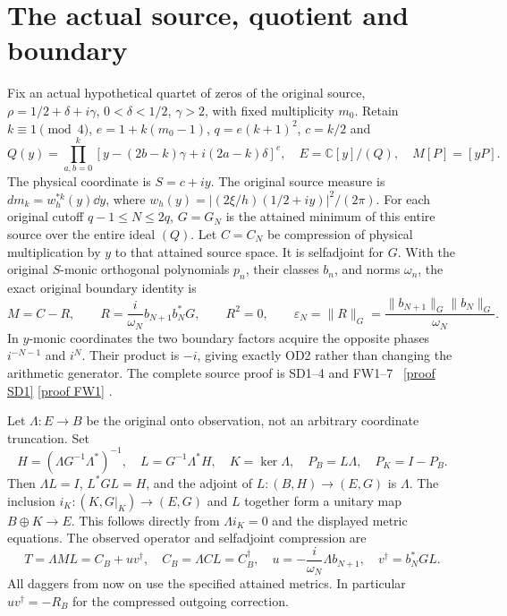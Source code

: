\documentclass[11pt]{article}
\newcommand{\C}{\mathbb C}\newcommand{\R}{\mathbb R}
\newcommand{\eps}{\varepsilon}
\begin{document}
\section{The actual source, quotient and boundary}
Fix an actual hypothetical quartet of zeros of the original source,
$\rho=1/2+\delta+i\gamma$, $0<\delta<1/2$, $\gamma>2$, with
fixed multiplicity $m_0$. Retain $k\equiv1\pmod4$, $e=1+k(m_0-1)$,
$q=e(k+1)^2$, $c=k/2$ and
\begin{equation}\tag{OD1}
 Q(y)=\prod_{a,b=0}^{k}
 [y-(2b-k)\gamma+i(2a-k)\delta]^e,
 \quad E=\C[y]/(Q),\quad M[P]=[yP].
\end{equation}
The physical coordinate is $S=c+iy$. The original source measure is
$dm_k=w_h^{*k}(y)\dd y$, where
$w_h(y)=|(2\xi/h)(1/2+iy)|^2/(2\pi)$. For each original cutoff
$q-1\le N\le2q$, $G=G_N$ is the attained minimum of this entire
source over the entire ideal $(Q)$. Let $C=C_N$ be compression of
physical multiplication by $y$ to that attained source space.
It is selfadjoint for $G$. With the original $S$-monic orthogonal
polynomials $p_n$, their classes $b_n$, and norms $\omega_n$, the exact
original boundary identity is
\begin{equation}\tag{OD2}
 M=C-R,\qquad R=\frac{i}{\omega_N}b_{N+1}b_N^*G,
 \qquad R^2=0,\qquad
 \eps_N=\|R\|_G=\frac{\|b_{N+1}\|_G\|b_N\|_G}{\omega_N}.
\end{equation}
In $y$-monic coordinates the two boundary factors acquire the opposite
phases $i^{-N-1}$ and $i^N$. Their product is $-i$, giving exactly
OD2 rather than changing the arithmetic generator. The complete
source proof is SD1--4 and FW1--7 \cite{SD,FW}%
~\href{https://github.com/KokunoYumeto/zeta-function-research-reader/blob/5992ad50c0f2a06921f1fcaded7b4e38097c0739/workbenches/splitzero-tandem/continuations/20260920-original-kernel-mixed-determinants/providers/ORIGINAL_SPECTRAL_DETERMINANT.tex\#L34}{[proof SD1]} \href{https://github.com/KokunoYumeto/zeta-function-research-reader/blob/5992ad50c0f2a06921f1fcaded7b4e38097c0739/workbenches/splitzero-tandem/continuations/20260920-original-kernel-mixed-determinants/providers/FULL_WINDOW_SOURCE_PRODUCTS.tex\#L28}{[proof FW1]}%
{}.

Let $\Lambda:E\longrightarrow B$ be the original onto observation,
not an arbitrary coordinate truncation. Set
\begin{equation}\tag{OD3}
 H=(\Lambda G^{-1}\Lambda^*)^{-1},\quad
 L=G^{-1}\Lambda^*H,\quad K=\ker\Lambda,\quad
 P_B=L\Lambda,\quad P_K=I-P_B.
\end{equation}
Then $\Lambda L=I$, $L^*GL=H$, and the adjoint of $L:(B,H)\to(E,G)$
is $\Lambda$. The inclusion $i_K:(K,G|_K)\to(E,G)$ and $L$ together
form a unitary map $B\oplus K\to E$. This follows directly from
$\Lambda i_K=0$ and the displayed metric equations. The observed
operator and selfadjoint compression are
\begin{equation}\tag{OD4}
 T=\Lambda ML=C_B+uv^\dagger,\quad
 C_B=\Lambda CL=C_B^\dagger,\quad
 u=-\frac{i}{\omega_N}\Lambda b_{N+1},\quad
 v^\dagger=b_N^*GL.
\end{equation}
All daggers from now on use the specified attained metrics. In
particular $uv^\dagger=-R_B$ for the compressed outgoing correction.
\end{document}
